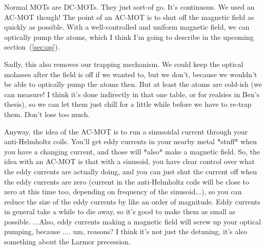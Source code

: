 Normal MOTs are DC-MOTs.  They just sort-of go.  It's continuous.  We used an AC-MOT though!  The point of an AC-MOT is to shut off the magnetic field as quickly as possible.  With a well-controlled and uniform magnetic field, we can optically pump the atoms, which I think I'm going to describe in the upcoming section~(\ref{sec:op}).

Sadly, this also removes our trapping mechanism.  We could keep the optical molasses after the field is off if we wanted to, but we don't, because we wouldn't be able to optically pump the atoms then.  But at least the atoms are cold-ish (we can measure!  I think it's done indirectly in that one table, or for realsies in Ben's thesis), so we can let them just chill for a little while before we have to re-trap them.  Don't lose too much.  

Anyway, the idea of the AC-MOT is to run a sinusoidal current through your anti-Helmholtz coils.  You'll get eddy currents in your nearby metal *stuff* when you have a changing current, and those will *also* make a magnetic field. So, the idea with an AC-MOT is that with a sinusoid, you have clear control over what the eddy currents are actually doing, and you can just shut the current off when the eddy currents are zero (current in the anti-Helmholtz coils will be close to zero at this time too, depending on frequency of the sinusoid...), so you can reduce the size of the eddy currents by like an order of magnitude.  Eddy currents in general take a while to die away, so it's good to make them as small as possible.  ...Also, eddy currents making a magnetic field will screw up your optical pumping, because .... um, reasons?  I think it's not just the detuning, it's also something about the Larmor precession.  

%	

